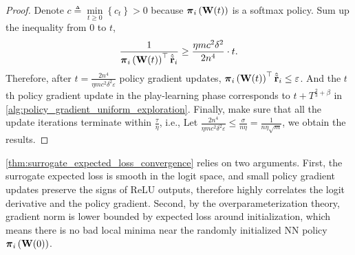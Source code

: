 \begin{proof}
Denote $c \triangleq \min\limits_{t \ge 0}{\left\{ c_t \right\}} > 0$ because ${\boldsymbol{\pi}}_i\left( {\mathbf{W}}(t) \right)$ is a softmax policy.
Sum up the inequality from $0$ to $t$,
\begin{equation*}
\begin{split}
    \frac{1}{{\boldsymbol{\pi}}_i\left( {\mathbf{W}}(t) \right)^\top \hat{{\tilde{\mathbf{r}}}}_i} \ge \frac{\eta m c^2 \delta^2}{2n^4} \cdot t.
\end{split}
\end{equation*}
Therefore, after $t =  \frac{2n^4}{\eta m c^2 \delta^2 \varepsilon}$ policy gradient updates, ${\boldsymbol{\pi}}_i\left( {\mathbf{W}}(t) \right)^\top \hat{{\tilde{\mathbf{r}}}}_i \le \varepsilon$. And the $t$th policy gradient update in the play-learning phase corresponds to $t + T^{\frac{2}{3} + \beta}$ in \cref{alg:policy_gradient_uniform_exploration}. Finally, make sure that all the update iterations terminate within $\frac{\tau}{\eta}$, i.e.,
Let $\frac{2n^4}{\eta m c^2 \delta^2 \varepsilon} \le \frac{\sigma}{n \eta} = \frac{1}{n \eta \sqrt{m}}$, we obtain the results.
\end{proof}

\cref{thm:surrogate_expected_loss_convergence} relies on two arguments. First, the surrogate expected loss is smooth in the logit space, and small policy gradient updates preserve the signs of ReLU outputs, therefore highly correlates the logit derivative and the policy gradient. Second, by the overparameterization theory, gradient norm is lower bounded by expected loss around initialization, which means there is no bad local minima near the randomly initialized NN policy ${\boldsymbol{\pi}}_i\left( {\mathbf{W}}(0) \right)$.

